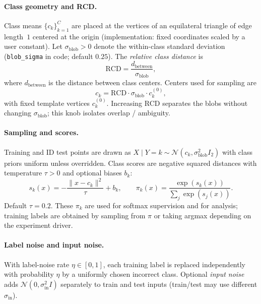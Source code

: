 \paragraph{Class geometry and RCD.}
Class means $\{c_k\}_{k=1}^C$ are placed at the vertices of an equilateral triangle of edge length~$1$ centered at the origin (implementation: fixed coordinates scaled by a user constant). Let $\sigma_{\mathrm{blob}}>0$ denote the within-class standard deviation (\texttt{blob\_sigma} in code; default $0.25$). The \emph{relative class distance} is
\begin{equation}
  \mathrm{RCD} = \frac{d_{\mathrm{between}}}{\sigma_{\mathrm{blob}}},
\end{equation}
where $d_{\mathrm{between}}$ is the distance between class centers. Centers used for sampling are
\begin{equation}
  c_k = \mathrm{RCD}\cdot \sigma_{\mathrm{blob}} \cdot c_k^{(0)},
\end{equation}
with fixed template vertices $c_k^{(0)}$. Increasing RCD separates the blobs without changing $\sigma_{\mathrm{blob}}$; this knob isolates overlap / ambiguity.

\paragraph{Sampling and scores.}
Training and ID test points are drawn as $X\mid Y=k \sim \mathcal{N}(c_k,\sigma_{\mathrm{blob}}^2 I_2)$ with class priors uniform unless overridden. Class scores are negative squared distances with temperature $\tau>0$ and optional biases $b_k$:
\begin{equation}
  s_k(x) = -\frac{\|x-c_k\|^2}{\tau} + b_k,
  \qquad
  \pi_k(x) = \frac{\exp(s_k(x))}{\sum_j \exp(s_j(x))}.
\end{equation}
Default $\tau=0.2$. These $\pi_k$ are used for softmax supervision and for analysis; training labels are obtained by sampling from $\pi$ or taking argmax depending on the experiment driver.

\paragraph{Label noise and input noise.}
With label-noise rate $\eta\in[0,1]$, each training label is replaced independently with probability $\eta$ by a uniformly chosen incorrect class. Optional \emph{input noise} adds $\mathcal{N}(0,\sigma_{\mathrm{in}}^2 I)$ separately to train and test inputs (train/test may use different $\sigma_{\mathrm{in}}$).

